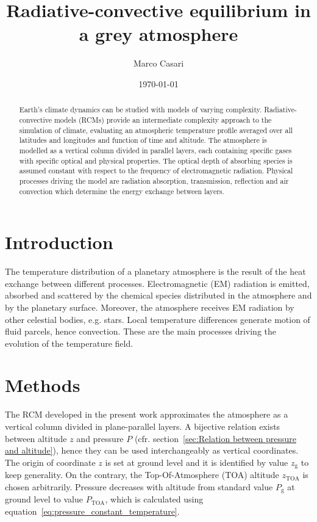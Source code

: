 \documentclass[a4paper,10pt,twocolumn,\classoptions]{article}
\newcommand{\zTOA}{z_\text{TOA}}
\newcommand{\PTOA}{P_\text{TOA}}
\begin{document}
\title{Radiative-convective equilibrium in a grey atmosphere}
\author{Marco Casari}
\date{\today}
\maketitle

\begin{abstract}
  Earth's climate dynamics can be studied with models of varying complexity. Radiative-convective models (RCMs) provide an intermediate complexity approach to the simulation of climate, evaluating an atmospheric temperature profile averaged over all latitudes and longitudes and function of time and altitude.
  The atmosphere is modelled as a vertical column divided in parallel layers, each containing specific gases with specific optical and physical properties. The optical depth of absorbing species is assumed constant with respect to the frequency of electromagnetic radiation.
  Physical processes driving the model are radiation absorption, transmission, reflection and air convection which determine the energy exchange between layers.
\end{abstract}


\section{Introduction}
The temperature distribution of a planetary atmosphere is the result of the heat exchange between different processes. Electromagnetic (EM) radiation is emitted, absorbed and scattered by the chemical species distributed in the atmosphere and by the planetary surface. Moreover, the atmosphere receives EM radiation by other celestial bodies, e.g. stars. Local temperature differences generate motion of fluid parcels, hence convection. These are the main processes driving the evolution of the temperature field.

\section{Methods}
\label{sec:Methods}
The RCM developed in the present work approximates the atmosphere as a vertical column divided in plane-parallel layers. 
A bijective relation exists between altitude $z$ and pressure $P$ (cfr. section~\ref{sec:Relation between pressure and altitude}), hence they can be used interchangeably as vertical coordinates. The origin of coordinate $z$ is set at ground level and it is identified by value $z_\text{g}$ to keep generality. On the contrary, the Top-Of-Atmosphere (TOA) altitude $\zTOA$ is chosen arbitrarily. Pressure decreases with altitude from standard value $P_\text{g}$ at ground level to value $\PTOA$, which is calculated using equation~\eqref{eq:pressure_constant_temperature}. %
\end{document}
